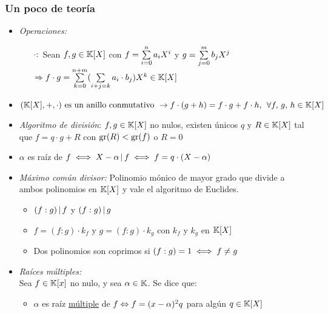 \newcommand{\polGen}[1]{\sumatoria{i=0}{n} #1_i X^i}
\newcommand{\mult}[1]{\text{mult}(#1)}


\subsubsection*{Un poco de teoría}

\begin{itemize}
	\item \textit{Operaciones: }
	      \begin{itemize}
		      gitem[$+:$] Sean $f,g \en \K[X]$ con $f = \polGen{a}$ y $g = \polGen{b}$\\
		            $\entonces f + g = \sumatoria{i=0}{n} (a_i + b_i) X^i \en \K[X]$
		      \item[$\cdot:$] Sean $f,g \en \K[X]$ con $f = \polGen{a}$ y $g = \sum\limits_{j=0}^{m} b_j X^j$\\
		            $\Rightarrow f \cdot g = \sum\limits_{k=0}^{n+m} (\sum\limits_{i+j=k}^{} a_i \cdot b_j) X^k \in \mathbb K[X]$
	      \end{itemize}
	\item $(\mathbb K[X],+,\cdot) \text{ es un anillo conmutativo } \to f\cdot(g+h) = f\cdot g + f\cdot h,\, \;\forall f,\,g,\,h \in \mathbb K[X]$

	\item \textit{Algoritmo de división}: $f,g \en \K[X]$ no nulos, existen únicos $q$ y $R \in \mathbb K[X]$ tal que $f = q\cdot g + R$
      con $\text{gr}(R) < \text{gr}(f)$ o $R = 0$

	\item $\alpha$ es raíz de $f \iff X - \alpha \, | \, f \iff f = q \cdot ( X - \alpha)$

	\item \textit{Máximo común divisor: } Polinomio mónico de mayor grado que divide a ambos polinomios en $\mathbb K[X]$
	      y vale el algoritmo de Euclides.
	      \begin{itemize}
		      \item $(f:g) \, | \, f$ y $(f:g) \, | \, g$

		      \item $f = (f:g)\cdot k_f$ y $g = (f:g)\cdot k_g$ con $k_f$ y $k_g$ en $\mathbb K[X]$

		      \item Dos polinomios son coprimos si $(f:g) = 1 \iff f \neq g$
	      \end{itemize}

	\item \textit{Raíces múltiples: }\\
	      Sea $f \in \mathbb K[x]$ no nulo, y sea $\alpha \in \mathbb K$. Se dice que:
	      \begin{itemize}
		      \item $\alpha$ es raíz \underline{múltiple} de $f \Leftrightarrow f = (x - \alpha)^2 q$ para algún $q \in \mathbb K[X]$


\end{itemize}
\end{itemize}
